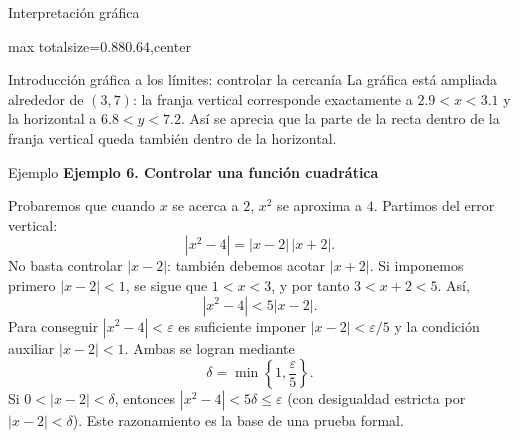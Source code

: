 \documentclass[12pt,aspectratio=169]{beamer}
\begin{document}
\begin{frame}[t,allowframebreaks]{Interpretación gráfica}
\begin{center}
\begin{adjustbox}{max totalsize={0.88\linewidth}{0.64\textheight},center}\end{adjustbox}
\end{center}
\end{frame}


\begin{frame}[t,allowframebreaks]{Introducción gráfica a los límites: controlar la cercanía}
La gráfica está ampliada alrededor de $(3,7)$: la franja vertical corresponde exactamente a $2.9<x<3.1$ y la horizontal a $6.8<y<7.2$. Así se aprecia que la parte de la recta dentro de la franja vertical queda también dentro de la horizontal.
\end{frame}


\begin{frame}[t,allowframebreaks]{Ejemplo}
{\color{azul}\bfseries Ejemplo 6. Controlar una función cuadrática}\par\medskip

Probaremos que cuando $x$ se acerca a $2$, $x^2$ se aproxima a $4$. Partimos del error vertical:
\[
 |x^2-4|=|x-2|\,|x+2|.
\]
No basta controlar $|x-2|$: también debemos acotar $|x+2|$. Si imponemos primero $|x-2|<1$, se sigue que $1<x<3$, y por tanto $3<x+2<5$. Así,
\[
 |x^2-4|<5|x-2|.
\]
Para conseguir $|x^2-4|<\varepsilon$ es suficiente imponer $|x-2|<\varepsilon/5$ y la condición auxiliar $|x-2|<1$. Ambas se logran mediante
\[
 \boxed{\delta=\min\left\{1,\frac{\varepsilon}{5}\right\}.}
\]
Si $0<|x-2|<\delta$, entonces $|x^2-4|<5\delta\le\varepsilon$ (con desigualdad estricta por $|x-2|<\delta$). Este razonamiento es la base de una prueba formal.
\end{frame}
\end{document}
